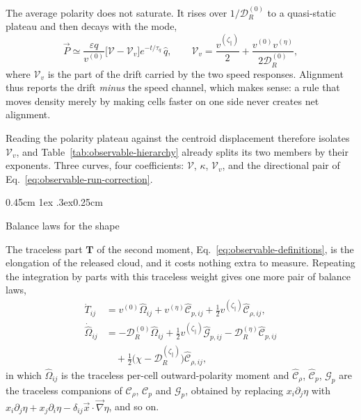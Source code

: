 \documentclass[
  reprint,
  superscriptaddress,
  amsmath,
  amssymb,
  aps,
  pre,
  nofootinbib,
  floatfix
]{revtex4-2}
\makeatletter
\newcommand{\grad}{\vec{\nabla}}
\newcommand{\DR}{\mathcal D_R^{(0)}}
\newcommand{\zp}{\zeta_\parallel}
\newcommand{\Pnet}{\vec P}
\newcommand{\Crho}{\mathcal C_\rho}
\newcommand{\Gp}{\mathcal G_p}
\newcommand{\Cp}{\mathcal C_p}
\newcommand{\Tsh}{\mathbf T}
\def\subsection{\@startsection{subsection}{2}{\z@}%
  {0.45cm \@plus1ex \@minus.3ex}{0.25cm}%
  {\normalfont\small\bfseries\raggedright}}%
\makeatother
\begin{document}
The average polarity does not saturate.  It rises over $1/\DR$ to a quasi-static
plateau and then decays with the mode,
\begin{equation}
 \Pnet\simeq\frac{\varepsilon q}{v^{(0)}}
 \bigl[\mathcal V-\mathcal V_v\bigr]e^{-t/\tau_q}\,\hat q,
 \qquad
 \mathcal V_v=\frac{v^{(\zp)}}{2}+\frac{v^{(0)}v^{(\eta)}}{2\DR},
 \label{eq:observable-polarity-plateau}
\end{equation}
where $\mathcal V_v$ is the part of the drift carried by the two speed
responses.  Alignment thus reports the drift \emph{minus} the speed channel,
which makes sense: a rule that moves density merely by making cells faster on
one side never creates net alignment.

Reading the polarity plateau against the centroid displacement therefore
isolates $\mathcal V_v$, and Table~\ref{tab:observable-hierarchy} already
splits its two members by their exponents.  Three curves, four coefficients:
$\mathcal V$, $\kappa$, $\mathcal V_v$, and the directional pair of
Eq.~\eqref{eq:observable-run-correction}.

\subsection{Balance laws for the shape}

The traceless part $\Tsh$ of the second moment,
Eq.~\eqref{eq:observable-definitions}, is the elongation of the released
cloud, and it costs nothing extra to measure.  Repeating the integration by
parts with this traceless weight gives one more pair of balance laws,
\begin{subequations}
\label{eq:shape-balance}
\begin{align}
 \dot T_{ij}&=v^{(0)}\hat\Omega_{ij}+v^{(\eta)}\hat{\mathcal C}_{p,ij}
 +\tfrac12 v^{(\zp)}\hat{\mathcal C}_{\rho,ij},
 \label{eq:shape-moment}\\
 \dot{\hat\Omega}_{ij}&=-\DR\hat\Omega_{ij}
 +\tfrac12v^{(\zp)}\hat{\mathcal G}_{p,ij}
 -\mathcal D_R^{(\eta)}\hat{\mathcal C}_{p,ij}
 \nonumber\\&\quad
 +\tfrac12\bigl(\chi-\mathcal D_R^{(\zp)}\bigr)\hat{\mathcal C}_{\rho,ij},
 \label{eq:shape-polarity}
\end{align}
\end{subequations}
in which $\hat\Omega_{ij}$ is the traceless per-cell outward-polarity moment and
$\hat{\mathcal C}_\rho$, $\hat{\mathcal C}_p$, $\hat{\mathcal G}_p$ are the
traceless companions of $\Crho$, $\Cp$ and $\Gp$,
obtained by replacing $x_i\partial_j\eta$ with
$x_i\partial_j\eta+x_j\partial_i\eta-\delta_{ij}\vec x\cdot\grad\eta$, and so
on.
\end{document}
